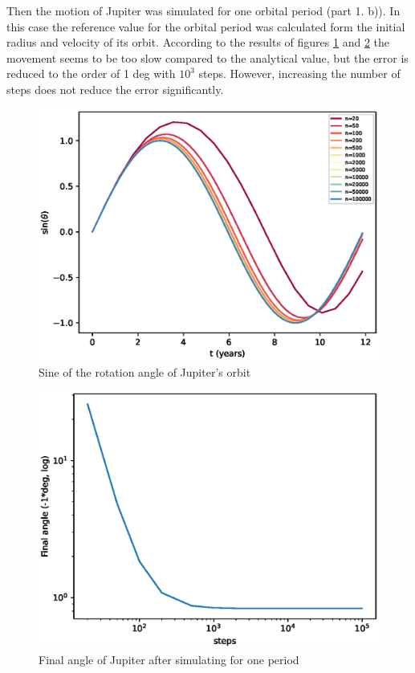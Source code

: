 \documentclass[a4paper]{article}
\begin{document}
\FloatBarrier
Then the motion of Jupiter was simulated for one orbital period (part 1. b)).
In this case the reference value for the orbital period was calculated form the initial radius and velocity of its orbit.
According to the results of figures \ref{fig:1b_1} and \ref{fig:1b_2} the movement seems to be too slow compared to the analytical value, but the error is reduced to the order of 1 deg with $10^3$ steps.
However, increasing the number of steps does not reduce the error significantly.
\begin{figure}[ht!]
\centering
\includegraphics[width=\textwidth]{fig_1b_1.eps}
\caption{Sine of the rotation angle of Jupiter's orbit}
\label{fig:1b_1}
\end{figure}

\begin{figure}[ht!]
\centering
\includegraphics[width=\textwidth]{fig_1b_2.eps}
\caption{Final angle of Jupiter after simulating for one period}
\label{fig:1b_2}
\end{figure}
\end{document}
